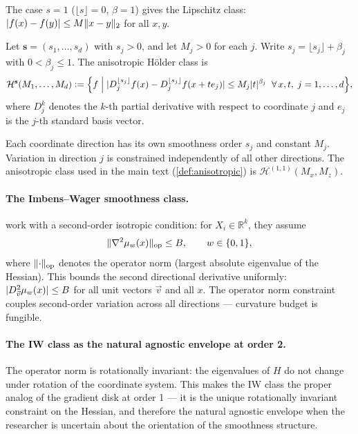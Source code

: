 The case $s = 1$ ($\lfloor s \rfloor = 0$, $\beta = 1$) gives the Lipschitz class: $\lvert f(x) - f(y)\rvert \leq M \lVert x - y\rVert_2$ for all $x, y$.

\begin{definition}\label{def:holder_aniso}
	Let $\mathbf{s} = (s_1, \ldots, s_d)$ with $s_j > 0$, and let $M_j > 0$ for each $j$.
	Write $s_j = \lfloor s_j \rfloor + \beta_j$ with $0 < \beta_j \leq 1$.
	The anisotropic Hölder class is
	\begin{equation*}
		\mathcal{H}^{\mathbf{s}}(M_1, \ldots, M_d) \vcentcolon= \Bigl\{ f \;\Big|\; \lvert D_j^{\lfloor s_j \rfloor} f(x) - D_j^{\lfloor s_j \rfloor} f(x + t e_j)\rvert \leq M_j \lvert t\rvert^{\beta_j} \;\;\forall\, x, t,\; j = 1, \ldots, d \Bigr\},
	\end{equation*}
	where $D_j^k$ denotes the $k$-th partial derivative with respect to coordinate $j$ and $e_j$ is the $j$-th standard basis vector.
\end{definition}

Each coordinate direction has its own smoothness order $s_j$ and constant $M_j$.
Variation in direction $j$ is constrained independently of all other directions.
The anisotropic class used in the main text (\cref{def:anisotropic}) is $\mathcal{H}^{(1,1)}(M_x, M_z)$.

\paragraph{The Imbens--Wager smoothness class.}
\textcite{imbens_optimized_2019} work with a second-order isotropic condition: for $X_i \in \mathbb{R}^k$, they assume
\begin{equation*}
	\lVert\nabla^2 \mu_w(x)\rVert_{\mathrm{op}} \leq B, \qquad w \in \{0, 1\},
\end{equation*}
where $\lVert\cdot\rVert_{\mathrm{op}}$ denotes the operator norm (largest absolute eigenvalue of the Hessian).
This bounds the second directional derivative uniformly: $\lvert D_{\vec{v}}^2 \mu_w(x)\rvert \leq B$ for all unit vectors $\vec{v}$ and all $x$.
The operator norm constraint couples second-order variation across all directions --- curvature budget is fungible.

\paragraph{The IW class as the natural agnostic envelope at order 2.}
The operator norm is rotationally invariant: the eigenvalues of $H$ do not change under rotation of the coordinate system.
This makes the IW class the proper analog of the gradient disk at order 1 --- it is the unique rotationally invariant constraint on the Hessian, and therefore the natural agnostic envelope when the researcher is uncertain about the orientation of the smoothness structure.

